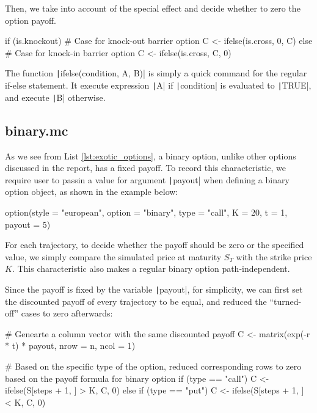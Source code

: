 Then, we take into account of the special effect and decide whether to zero the option payoff.

\begin{Rminted}
if (is.knockout) { # Case for knock-out barrier option
    C <- ifelse(is.cross, 0, C)
} else { # Case for knock-in barrier option
    C <- ifelse(is.cross, C, 0)
}
\end{Rminted}

The function \texttt|ifelse(condition, A, B)| is simply a quick command for the regular if-else statement. It execute expression \texttt|A| if \texttt|condition| is evaluated to \texttt|TRUE|, and execute \texttt|B| otherwise.

\subsection{binary.mc}

As we see from List \ref{lst:exotic_options}, a binary option, unlike other options discussed in the report, has a fixed payoff. To record this characteristic, we require user to passin a value for argument \texttt|payout| when defining a binary option object, as shown in the example below:

\begin{Rminted}
option(style = "european", option = "binary", type = "call", K = 20, t = 1, payout = 5)
\end{Rminted}

For each trajectory, to decide whether the payoff should be zero or the specified value, we simply compare the simulated price at maturity $S_T$ with the strike price $K$. This characteristic also makes a regular binary option path-independent.

Since the payoff is fixed by the variable \texttt|payout|, for simplicity, we can first set the discounted payoff of every trajectory to be equal, and reduced the ``turned-off'' cases to zero afterwards:

\begin{Rminted}
# Genearte a column vector with the same discounted payoff
C <- matrix(exp(-r * t) * payout, nrow = n, ncol = 1)

# Based on the specific type of the option, reduced corresponding rows to zero based on the payoff formula for binary option
if (type == "call") {
    C <- ifelse(S[steps + 1, ] > K, C, 0)
} else if (type == "put") {
    C <- ifelse(S[steps + 1, ] < K, C, 0)
}
\end{Rminted}

